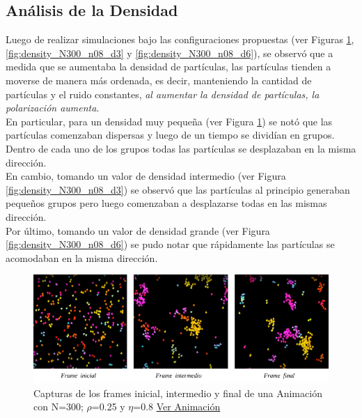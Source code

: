 \documentclass[12pt, a4paper]{report}
\begin{document}
\subsection{Análisis de la Densidad}

Luego de realizar simulaciones bajo las configuraciones propuestas (ver Figuras \ref{fig:density_N300_n08_d025}, \ref{fig:density_N300_n08_d3} y \ref{fig:density_N300_n08_d6}), se observó que a medida que se aumentaba la densidad de partículas, las partículas tienden a moverse de manera más ordenada, es decir, manteniendo la cantidad de partículas y el ruido constantes, \emph{al aumentar la densidad de partículas, la polarización aumenta}.\\

En particular, para un densidad muy pequeña (ver Figura \ref{fig:density_N300_n08_d025}) se notó que las partículas comenzaban dispersas y luego de un tiempo se dividían en grupos. Dentro de cada uno de los grupos todas las partículas se desplazaban en la misma dirección. \\

En cambio, tomando un valor de densidad intermedio (ver Figura \ref{fig:density_N300_n08_d3}) se observó que las partículas al principio generaban pequeños grupos pero luego comenzaban a desplazarse todas en las mismas dirección.\\

Por último, tomando un valor de densidad grande (ver Figura \ref{fig:density_N300_n08_d6}) se pudo notar que rápidamente las partículas se acomodaban en la misma dirección. 

\begin{figure}[h]
\includegraphics[scale=0.54]{density_N300_n08_d025.png}
\centering 
\caption{Capturas de los frames inicial, intermedio y final de una Animación con N=300; $\rho$=0.25 y $\eta$=0.8 \href{https://www.youtube.com/watch?v=j0crtCYmx9E}{\underline{Ver Animación}}}
\label{fig:density_N300_n08_d025}
\end{figure}
\end{document}
